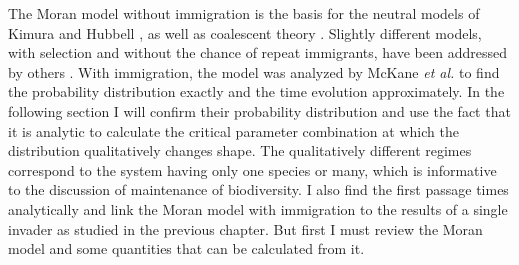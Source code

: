 The Moran model without immigration is the basis for the neutral models of Kimura \cite{Kimura1955,Crow1956,Patwa2008,Houchmandzadeh2010} and Hubbell \cite{Bell2000,Hubbell2001}, as well as coalescent theory \cite{Kingman1982,Blythe2007,Etheridge2010}. 
Slightly different models, with selection and without the chance of repeat immigrants, have been addressed by others \cite{Taylor2004,Claussen2005,Lambert2006,Blythe2007,Parsons2007,Pigolotti2013,Chalub2016,Czuppon2017}. 
With immigration, the model was analyzed by McKane \emph{et al.} \cite{McKane2003} to find the probability distribution exactly and the time evolution approximately. 
In the following section I will confirm their probability distribution and use the fact that it is analytic to calculate the critical parameter combination at which the distribution qualitatively changes shape. 
The qualitatively different regimes correspond to the system having only one species or many, which is informative to the discussion of maintenance of biodiversity. 
I also find the first passage times analytically and link the Moran model with immigration to the results of a single invader as studied in the previous chapter. 
But first I must review the Moran model and some quantities that can be calculated from it. 

\iffalse
As a reminder, the Moran model \cite{Moran1962} is a classic urn model used in population dynamics in a variety of ways.
Its most prominent uses are in coalescent theory \cite{Kingman1982,Blythe2007,Etheridge2010} and neutral theory \cite{Kimura1956,Bell2000,Hubbell2001}, describing how the relative proportion of genes in a gene pool might change over time. 
In fact it can describe any system where individuals of different species/strains undergo strong but unselective competition in some closed or finite ecosystem \cite{Claussen2005}: applications include cancer progression \cite{Ashcroft2015}, evolutionary game theory \cite{Tayloer2004,Antal2006,Hilbe2011}, competition between species \cite{Houchmandzadeh2011,Blythe2011,Constable2015}, population dynamics with evolution \cite{Traulsen2006}, and linguistics \cite{Blythe2007}. 
\fi

